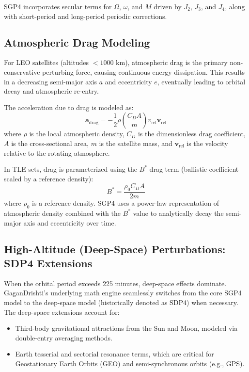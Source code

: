 \documentclass[11pt,journal,onecolumn]{IEEEtran}
\begin{document}
SGP4 incorporates secular terms for $\Omega$, $\omega$, and $M$ driven by $J_2$, $J_3$, and $J_4$, along with short-period and long-period periodic corrections.

\subsection{Atmospheric Drag Modeling}
For LEO satellites (altitudes $< 1000\text{ km}$), atmospheric drag is the primary non-conservative perturbing force, causing continuous energy dissipation. This results in a decreasing semi-major axis $a$ and eccentricity $e$, eventually leading to orbital decay and atmospheric re-entry.

The acceleration due to drag is modeled as:
\begin{equation}
\mathbf{a}_{\text{drag}} = -\frac{1}{2} \rho \left( \frac{C_D A}{m} \right) v_{\text{rel}} \mathbf{v}_{\text{rel}}
\label{eq:drag}
\end{equation}
where $\rho$ is the local atmospheric density, $C_D$ is the dimensionless drag coefficient, $A$ is the cross-sectional area, $m$ is the satellite mass, and $\mathbf{v}_{\text{rel}}$ is the velocity relative to the rotating atmosphere.

In TLE sets, drag is parameterized using the $B^*$ drag term (ballistic coefficient scaled by a reference density):
\begin{equation}
B^* = \frac{\rho_0 C_D A}{2 m}
\label{eq:bstar}
\end{equation}
where $\rho_0$ is a reference density. SGP4 uses a power-law representation of atmospheric density combined with the $B^*$ value to analytically decay the semi-major axis and eccentricity over time.

\subsection{High-Altitude (Deep-Space) Perturbations: SDP4 Extensions}
When the orbital period exceeds 225 minutes, deep-space effects dominate. GaganDrishti's underlying math engine seamlessly switches from the core SGP4 model to the deep-space model (historically denoted as SDP4) when necessary. The deep-space extensions account for:
\begin{itemize}
    \item Third-body gravitational attractions from the Sun and Moon, modeled via double-entry averaging methods.
    \item Earth tesserial and sectorial resonance terms, which are critical for Geostationary Earth Orbits (GEO) and semi-synchronous orbits (e.g., GPS).
\end{itemize}
\end{document}

